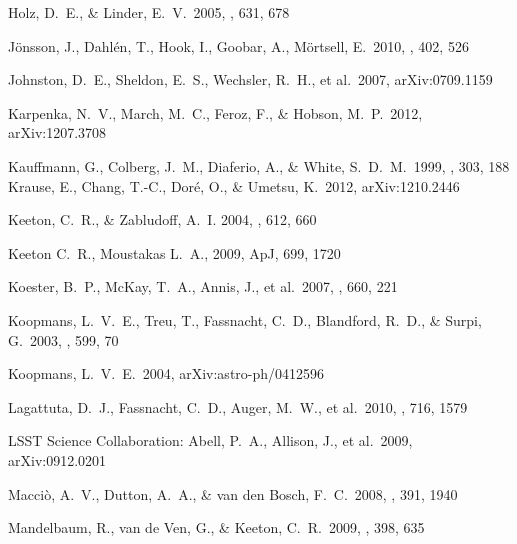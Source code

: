 \begin{thebibliography}{99}
 Holz, D.~E., \& Linder, E.~V.\ 2005, \apj, 631, 678 

 J{\"o}nsson, J., 
Dahl{\'e}n, T., Hook, I., Goobar, A., M{\"o}rtsell, E.\ 2010, \mnras, 402, 526 

 Johnston, D.~E., 
Sheldon, E.~S., Wechsler, R.~H., et al.\ 2007, arXiv:0709.1159 


 Karpenka, N.~V., 
March, M.~C., Feroz, F., \& Hobson, M.~P.\ 2012, arXiv:1207.3708 

 Kauffmann, G., 
Colberg, J.~M., Diaferio, A., \& White, S.~D.~M.\ 1999, \mnras, 303, 188
 Krause, E., Chang, 
T.-C., Dor{\'e}, O., \& Umetsu, K.\ 2012, arXiv:1210.2446 

{Keeton}, C.~R., \& {Zabludoff}, A.~I. 2004, \apj, 612, 660

 Keeton C.~R., Moustakas L.~A., 2009, ApJ, 699, 1720 


 Koester, B.~P., McKay, 
T.~A., Annis, J., et al.\ 2007, \apj, 660, 221 

 Koopmans, L.~V.~E., 
Treu, T., Fassnacht, C.~D., Blandford, R.~D., 
\& Surpi, G.\ 2003, \apj, 599, 70 


 Koopmans, L.~V.~E.\ 2004, 
arXiv:astro-ph/0412596 

 Lagattuta, D.~J., 
Fassnacht, C.~D., Auger, M.~W., et al.\ 2010, \apj, 716, 1579 

 LSST 
Science Collaboration: Abell, P.~A., Allison, J., et al.\ 2009, 
arXiv:0912.0201 

 Macci{\`o}, A.~V., 
Dutton, A.~A., \& van den Bosch, F.~C.\ 2008, \mnras, 391, 1940 

 Mandelbaum, R., van 
de Ven, G., \& Keeton, C.~R.\ 2009, \mnras, 398, 635 




\end{thebibliography}

